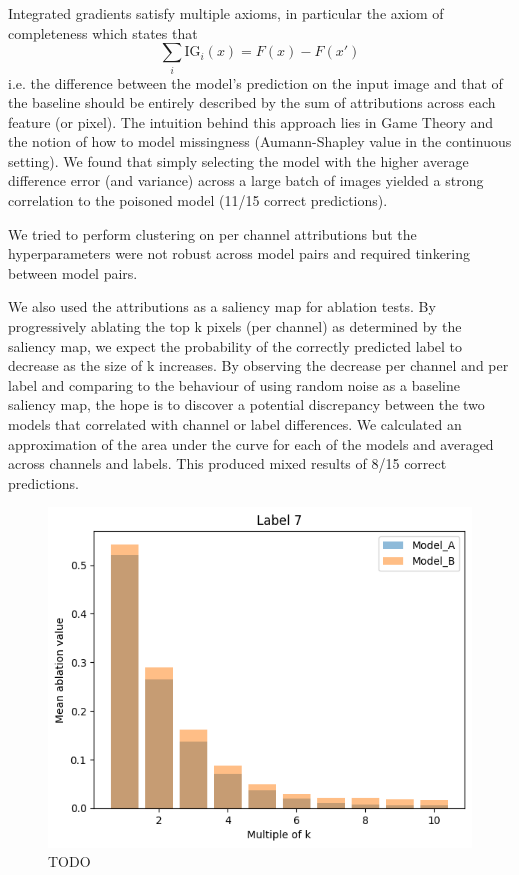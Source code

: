 \documentclass[letterpaper]{article} %
\begin{document}
Integrated gradients satisfy multiple axioms, in particular the axiom of completeness which states that $$\sum \limits_i \text{IG}_i(x) = F(x) - F(x')$$ i.e. the difference between the model's prediction on the input image and that of the baseline should be entirely described by the sum of attributions across each feature (or pixel). The intuition behind this approach lies in Game Theory and the notion of how to model missingness (Aumann-Shapley value in the continuous setting). We found that simply selecting the model with the higher average difference error (and variance) across a large batch of images yielded a strong correlation to the poisoned model (11/15 correct predictions).

We tried to perform clustering on per channel attributions but the hyperparameters were not robust across model pairs and required tinkering between model pairs.

We also used the attributions as a saliency map for ablation tests. By progressively ablating the top k pixels (per channel) as determined by the saliency map, we expect the probability of the correctly predicted label to decrease as the size of k increases. By observing the decrease per channel and per label and comparing to the behaviour of using random noise as a baseline saliency map, the hope is to discover a potential discrepancy between the two models that correlated with channel or label differences. We calculated an approximation of the area under the curve for each of the models and averaged across channels and labels. This produced mixed results of 8/15 correct predictions.

\begin{figure}[h!]
\centering
\includegraphics[width=\columnwidth]{figures/round_1_integrated_gradients2.png}
\caption{TODO}
\end{figure}
\end{document}
